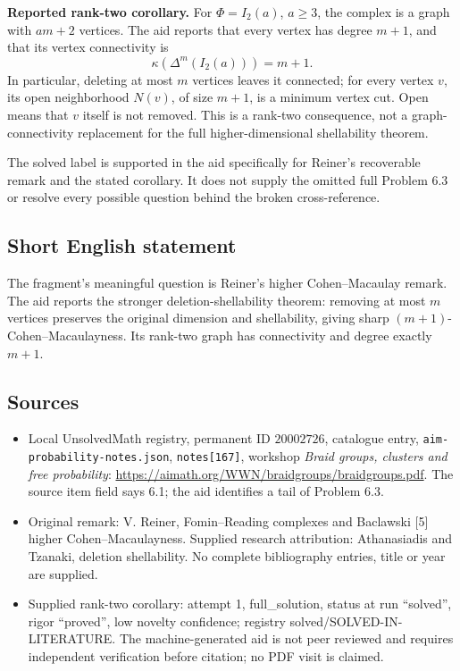 \documentclass[11pt]{article}
\begin{document}
\textbf{Reported rank-two corollary.} For \(\Phi=I_2(a)\), \(a\geq3\), the complex is a graph with \(am+2\) vertices. The aid reports that every vertex has degree \(m+1\), and that its vertex connectivity is
\[
 \kappa(\Delta^m(I_2(a)))=m+1.
\]
In particular, deleting at most \(m\) vertices leaves it connected; for every vertex \(v\), its open neighborhood \(N(v)\), of size \(m+1\), is a minimum vertex cut. Open means that \(v\) itself is not removed. This is a rank-two consequence, not a graph-connectivity replacement for the full higher-dimensional shellability theorem.

The solved label is supported in the aid specifically for Reiner's recoverable remark and the stated corollary. It does not supply the omitted full Problem 6.3 or resolve every possible question behind the broken cross-reference.
\subsection{Short English statement}
The fragment's meaningful question is Reiner's higher Cohen--Macaulay remark. The aid reports the stronger deletion-shellability theorem: removing at most \(m\) vertices preserves the original dimension and shellability, giving sharp \((m+1)\)-Cohen--Macaulayness. Its rank-two graph has connectivity and degree exactly \(m+1\).
\subsection{Sources}
\begin{itemize}
\item Local UnsolvedMath registry, permanent ID \(20002726\), catalogue entry, \texttt{aim-probability-notes.json}, \texttt{notes[167]}, workshop \emph{Braid groups, clusters and free probability}: \url{https://aimath.org/WWN/braidgroups/braidgroups.pdf}. The source item field says 6.1; the aid identifies a tail of Problem 6.3.
\item Original remark: V. Reiner, Fomin--Reading complexes and Baclawski [5] higher Cohen--Macaulayness. Supplied research attribution: Athanasiadis and Tzanaki, deletion shellability. No complete bibliography entries, title or year are supplied.
\item Supplied rank-two corollary: attempt 1, full\_solution, status at run ``solved'', rigor ``proved'', low novelty confidence; registry solved/SOLVED-IN-LITERATURE. The machine-generated aid is not peer reviewed and requires independent verification before citation; no PDF visit is claimed.
\end{itemize}
\end{document}
